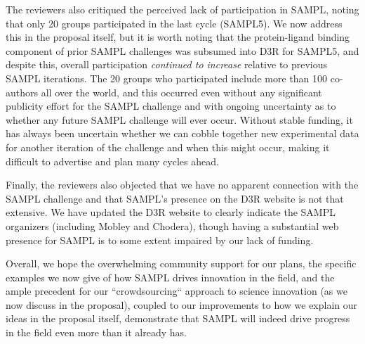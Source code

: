 \documentclass[11pt]{article}
\begin{document}
The reviewers also critiqued the perceived lack of participation in SAMPL, noting that only 20 groups participated in the last cycle (SAMPL5). 
We now address this in the proposal itself, but it is worth noting that the protein-ligand binding component of prior SAMPL challenges was subsumed into D3R for SAMPL5, and despite this, overall participation \emph{continued to increase} relative to previous SAMPL iterations. 
The 20 groups who participated include more than 100 co-authors all over the world, and this occurred even without any significant publicity effort for the SAMPL challenge and with ongoing uncertainty as to whether any future SAMPL challenge will ever occur. 
Without stable funding, it has always been uncertain whether we can cobble together new experimental data for another iteration of the challenge and when this might occur, making it difficult to advertise and plan many cycles ahead. 

Finally, the reviewers also objected that we have no apparent connection with the SAMPL challenge and that SAMPL's presence on the D3R website is not that extensive. 
We have updated the D3R website to clearly indicate the SAMPL organizers (including Mobley and Chodera), though having a substantial web presence for SAMPL is to some extent impaired by our lack of funding. 

Overall, we hope the overwhelming community support for our plans, the specific examples we now give of how SAMPL drives innovation in the field, and the ample precedent for our ``crowdsourcing`` approach to science innovation (as we now discuss in the proposal), coupled to our improvements to how we explain our ideas in the proposal itself, demonstrate that SAMPL will indeed drive progress in the field even more than it already has. 

\end{document}
